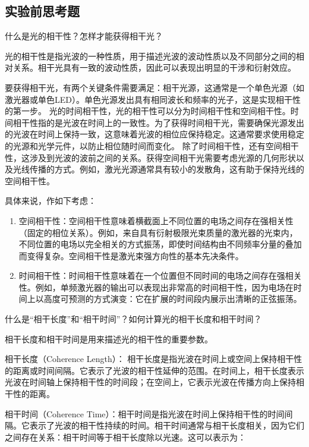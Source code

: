 \documentclass[dvipsnames, svgnames,a4paper,11pt]{article}
\begin{document}
	\subsection{实验前思考题}
	\begin{question}
		什么是光的相干性？怎样才能获得相干光？
	\end{question}	
	光的相干性是指光波的一种性质，用于描述光波的波动性质以及不同部分之间的相对关系。相干光具有一致的波动性质，因此可以表现出明显的干涉和衍射效应。
	
	要获得相干光，有两个关键条件需要满足：相干光源，这通常是一个单色光源（如激光器或单色LED）。单色光源发出具有相同波长和频率的光子，这是实现相干性的第一步。
	光的时间相干性，光的相干性可以分为时间相干性和空间相干性。时间相干性指的是光波在时间上的一致性。为了获得时间相干光，需要确保光源发出的光波在时间上保持一致，这意味着光波的相位应保持稳定。这通常要求使用稳定的光源和光学元件，以防止相位随时间而变化。
	除了时间相干性，还有空间相干性，这涉及到光波的波前之间的关系。获得空间相干光需要考虑光源的几何形状以及光线传播的方式。例如，激光光源通常具有较小的发散角，这有助于保持光线的空间相干性。
	
	具体来说，作如下考虑：
	\begin{enumerate}
		\item 空间相干性：空间相干性意味着横截面上不同位置的电场之间存在强相关性（固定的相位关系）。例如，来自具有衍射极限光束质量的激光器的光束内，不同位置的电场以完全相关的方式振荡，即使时间结构由不同频率分量的叠加而变得复杂。空间相干性是激光束强方向性的基本先决条件。
		\item 时间相干性：时间相干性意味着在一个位置但不同时间的电场之间存在强相关性。例如，单频激光器的输出可以表现出非常高的时间相干性，因为电场在时间上以高度可预测的方式演变：它在扩展的时间段内展示出清晰的正弦振荡。
	\end{enumerate}
	
	\begin{question}
		什么是“相干长度”和“相干时间”？如何计算光的相干长度和相干时间？
	\end{question}
	相干长度和相干时间是用来描述光的相干性的重要参数。
	
	相干长度（Coherence Length）：
	相干长度是指光波在时间上或空间上保持相干性的距离或时间间隔。它表示了光波的相干性延伸的范围。在时间上，相干长度表示光波在时间轴上保持相干性的时间段；在空间上，它表示光波在传播方向上保持相干性的距离。
	
	相干时间（Coherence Time）：相干时间是指光波在时间上保持相干性的时间间隔。它表示了光波的相干性持续的时间。相干时间通常与相干长度相关，因为它们之间存在关系：相干时间等于相干长度除以光速。这可以表示为：
	
\end{document}
